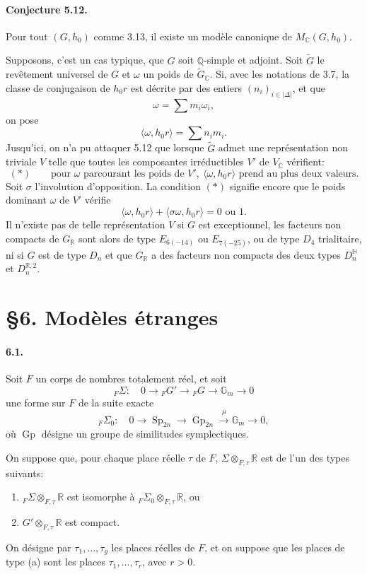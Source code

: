 \documentclass[10pt]{article}
\newcommand{\C}{\mathbb C}
\newcommand{\Gm}{\mathbb G_m}
\newcommand{\Q}{\mathbb Q}
\newcommand{\R}{\mathbb R}
\newcommand{\Gp}{\operatorname{Gp}}
\newcommand{\MC}{M_{\C}}
\newcommand{\Sp}{\operatorname{Sp}}
\begin{document}
\paragraph{Conjecture 5.12.} Pour tout $(G,h_0)$ comme 3.13, il existe un modèle canonique de $\MC(G,h_0)$.

Supposons, c'est un cas typique, que $G$ soit $\Q$-simple et adjoint. Soit $\widetilde G$ le revêtement universel de $G$ et $\omega$ un poids de $\widetilde G_{\C}$. Si, avec les notations de 3.7, la classe de conjugaison de $h_0r$ est décrite par des entiers $(n_i)_{i\in|\Delta|}$, et que
\[
\omega=\sum m_i\omega_i,
\]
on pose
\[
\langle\omega,h_0r\rangle=\sum n_i m_i.
\]
Jusqu'ici, on n'a pu attaquer 5.12 que lorsque $\widetilde G$ admet une représentation non triviale $V$ telle que toutes les composantes irréductibles $V'$ de $V_{\C}$ vérifient:
\[
(*)\qquad
\text{pour }\omega\text{ parcourant les poids de }V',\ 
\langle\omega,h_0r\rangle\text{ prend au plus deux valeurs.}
\]
Soit $\sigma$ l'involution d'opposition. La condition $(*)$ signifie encore que le poids dominant $\omega$ de $V'$ vérifie
\[
\langle\omega,h_0r\rangle+\langle\sigma\omega,h_0r\rangle=0\text{ ou }1.
\]
Il n'existe pas de telle représentation $V$ si $G$ est exceptionnel, les facteurs non compacts de $G_{\R}$ sont alors de type $E_{6(-14)}$ ou $E_{7(-25)}$, ou de type $D_4$ trialitaire, ni si $G$ est de type $D_n$ et que $G_{\R}$ a des facteurs non compacts des deux types $D_n^{\mathbb H}$ et $D_n^{\mathbb R,2}$.

\section*{\S 6. Modèles étranges}

\paragraph{6.1.} Soit $F$ un corps de nombres totalement réel, et soit
\[
\tag{6.1.1}
{}_F\Sigma:\quad 0\longrightarrow {}_FG'\longrightarrow {}_FG
 \longrightarrow \Gm\longrightarrow0
\]
une forme sur $F$ de la suite exacte
\[
\tag{6.1.2}
{}_F\Sigma_0:\quad 0\longrightarrow\Sp_{2n}\longrightarrow\Gp_{2n}
 \xrightarrow{\ \mu\ }\Gm\longrightarrow0,
\]
où $\Gp$ désigne un groupe de similitudes symplectiques.

On suppose que, pour chaque place réelle $\tau$ de $F$, $\Sigma\otimes_{F,\tau}\R$ est de l'un des types suivants:
\begin{enumerate}[label=(\alph*)]
\item ${}_F\Sigma\otimes_{F,\tau}\R$ est isomorphe à ${}_F\Sigma_0\otimes_{F,\tau}\R$, ou
\item $G'\otimes_{F,\tau}\R$ est compact.
\end{enumerate}
On désigne par $\tau_1,\ldots,\tau_g$ les places réelles de $F$, et on suppose que les places de type (a) sont les places $\tau_1,\ldots,\tau_r$, avec $r>0$.
\end{document}
